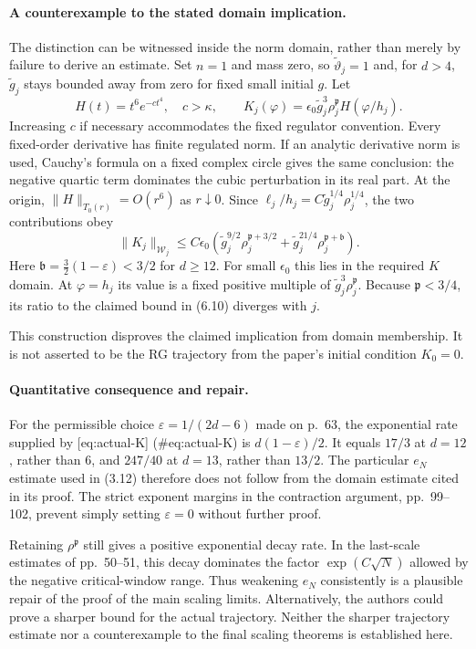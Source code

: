 \documentclass[10pt]{article}
\begin{document}
\paragraph*{A counterexample to the stated domain implication.}\mbox{}\par
The distinction can be witnessed inside the norm domain, rather than merely by failure to derive an estimate. Set \(n=1\) and mass zero, so \(\widetilde\vartheta_j=1\) and, for \(d>4\), \(\widetilde g_j\) stays bounded away from zero for fixed small initial \(g\). Let \[H(t)=t^6e^{-ct^4},\quad c>\kappa,\qquad
 K_j(\varphi)=\epsilon_0\widetilde g_j^3\rho_j^{\mathfrak p}
                         H(\varphi/h_j).\] Increasing \(c\) if necessary accommodates the fixed regulator convention. Every fixed-order derivative has finite regulated norm. If an analytic derivative norm is used, Cauchy’s formula on a fixed complex circle gives the same conclusion: the negative quartic term dominates the cubic perturbation in its real part. At the origin, \(\|H\|_{T_0(r)}=O(r^6)\) as \(r\downarrow0\). Since \(\ell_j/h_j=C\widetilde g_j^{1/4}\rho_j^{1/4}\), the two contributions obey \[\|K_j\|_{\mathcal W_j}\leq C\epsilon_0
 \left(\widetilde g_j^{9/2}\rho_j^{\mathfrak p+3/2}
              +\widetilde g_j^{21/4}\rho_j^{\mathfrak p+\mathfrak b}\right).\] Here \(\mathfrak b=\tfrac32(1-\varepsilon)<3/2\) for \(d\geq12\). For small \(\epsilon_0\) this lies in the required \(K\) domain. At \(\varphi=h_j\) its value is a fixed positive multiple of \(\widetilde g_j^3\rho_j^{\mathfrak p}\). Because \(\mathfrak p<3/4\), its ratio to the claimed bound in (6.10) diverges with \(j\).\par
This construction disproves the claimed implication from domain membership. It is not asserted to be the RG trajectory from the paper’s initial condition \(K_0=0\).\par
\paragraph*{Quantitative consequence and repair.}\mbox{}\par
For the permissible choice \(\varepsilon=1/(2d-6)\) made on p. 63, the exponential rate supplied by [eq:actual-K] (\#eq:actual-K) is \(d(1-\varepsilon)/2\). It equals \(17/3\) at \(d=12\), rather than \(6\), and \(247/40\) at \(d=13\), rather than \(13/2\). The particular \(e_N\) estimate used in (3.12) therefore does not follow from the domain estimate cited in its proof. The strict exponent margins in the contraction argument, pp. 99–102, prevent simply setting \(\varepsilon=0\) without further proof.\par
Retaining \(\rho^{\mathfrak p}\) still gives a positive exponential decay rate. In the last-scale estimates of pp. 50–51, this decay dominates the factor \(\exp(C\sqrt N)\) allowed by the negative critical-window range. Thus weakening \(e_N\) consistently is a plausible repair of the proof of the main scaling limits. Alternatively, the authors could prove a sharper bound for the actual trajectory. Neither the sharper trajectory estimate nor a counterexample to the final scaling theorems is established here.\par
\end{document}
